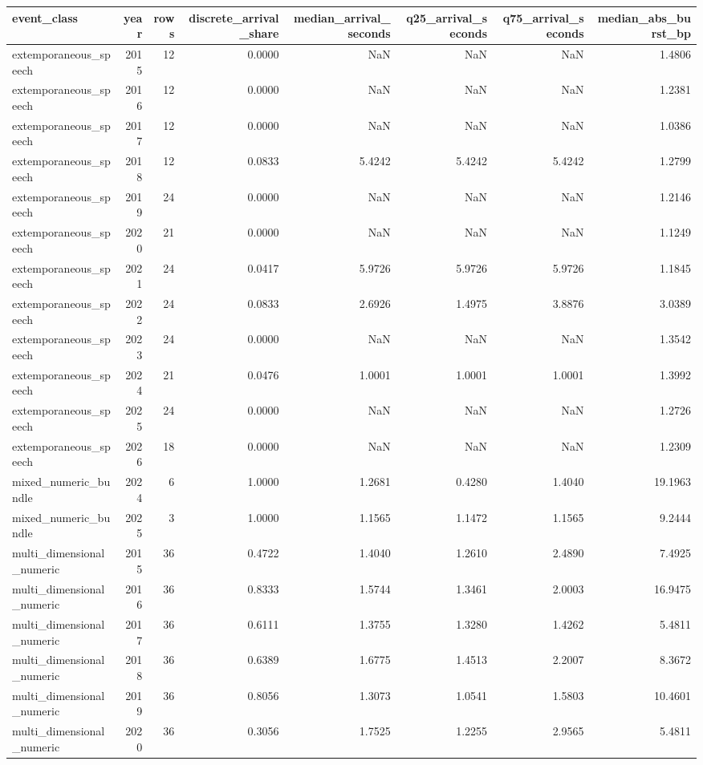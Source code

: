 \begin{tabular}{lrrrrrrr}
\toprule
event_class & year & rows & discrete_arrival_share & median_arrival_seconds & q25_arrival_seconds & q75_arrival_seconds & median_abs_burst_bp \\
\midrule
extemporaneous_speech & 2015 & 12 & 0.0000 & NaN & NaN & NaN & 1.4806 \\
extemporaneous_speech & 2016 & 12 & 0.0000 & NaN & NaN & NaN & 1.2381 \\
extemporaneous_speech & 2017 & 12 & 0.0000 & NaN & NaN & NaN & 1.0386 \\
extemporaneous_speech & 2018 & 12 & 0.0833 & 5.4242 & 5.4242 & 5.4242 & 1.2799 \\
extemporaneous_speech & 2019 & 24 & 0.0000 & NaN & NaN & NaN & 1.2146 \\
extemporaneous_speech & 2020 & 21 & 0.0000 & NaN & NaN & NaN & 1.1249 \\
extemporaneous_speech & 2021 & 24 & 0.0417 & 5.9726 & 5.9726 & 5.9726 & 1.1845 \\
extemporaneous_speech & 2022 & 24 & 0.0833 & 2.6926 & 1.4975 & 3.8876 & 3.0389 \\
extemporaneous_speech & 2023 & 24 & 0.0000 & NaN & NaN & NaN & 1.3542 \\
extemporaneous_speech & 2024 & 21 & 0.0476 & 1.0001 & 1.0001 & 1.0001 & 1.3992 \\
extemporaneous_speech & 2025 & 24 & 0.0000 & NaN & NaN & NaN & 1.2726 \\
extemporaneous_speech & 2026 & 18 & 0.0000 & NaN & NaN & NaN & 1.2309 \\
mixed_numeric_bundle & 2024 & 6 & 1.0000 & 1.2681 & 0.4280 & 1.4040 & 19.1963 \\
mixed_numeric_bundle & 2025 & 3 & 1.0000 & 1.1565 & 1.1472 & 1.1565 & 9.2444 \\
multi_dimensional_numeric & 2015 & 36 & 0.4722 & 1.4040 & 1.2610 & 2.4890 & 7.4925 \\
multi_dimensional_numeric & 2016 & 36 & 0.8333 & 1.5744 & 1.3461 & 2.0003 & 16.9475 \\
multi_dimensional_numeric & 2017 & 36 & 0.6111 & 1.3755 & 1.3280 & 1.4262 & 5.4811 \\
multi_dimensional_numeric & 2018 & 36 & 0.6389 & 1.6775 & 1.4513 & 2.2007 & 8.3672 \\
multi_dimensional_numeric & 2019 & 36 & 0.8056 & 1.3073 & 1.0541 & 1.5803 & 10.4601 \\
multi_dimensional_numeric & 2020 & 36 & 0.3056 & 1.7525 & 1.2255 & 2.9565 & 5.4811 \\

\end{tabular}
